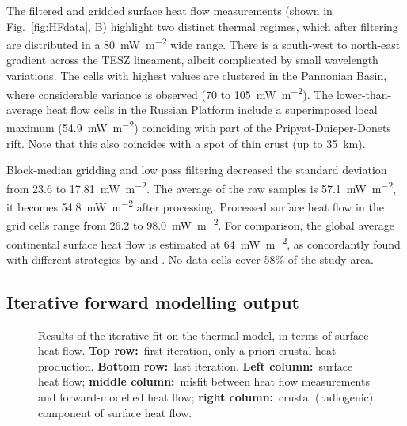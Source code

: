The filtered and gridded surface heat flow measurements (shown in Fig.~\ref{fig:HFdata}, B) highlight two distinct thermal regimes, which after filtering are distributed in a 80~\si{\milli \watt \per \square \metre} wide range.
There is a south-west to north-east gradient across the TESZ lineament, albeit complicated by small wavelength variations.
The cells with highest values are clustered in the Pannonian Basin, where considerable variance is observed (70 to 105~\si{\milli \watt \per \square \metre}).
The lower-than-average heat flow cells in the Russian Platform include a superimposed local maximum (54.9~\si{\milli \watt \per \square \metre}) coinciding with part of the Pripyat-Dnieper-Donets rift.
Note that this also coincides with a spot of thin crust (up to 35~\si{\kilo \metre}).

Block-median gridding and low pass filtering decreased the standard deviation from 23.6 to 17.81~\si{\milli \watt \per \square \metre}.
The average of the raw samples is 57.1~\si{\milli \watt \per \square \metre}, it becomes 54.8~\si{\milli \watt \per \square \metre} after processing.
Processed surface heat flow in the grid cells range from 26.2 to 98.0~\si{\milli \watt \per \square \metre}.
For comparison, the global average continental surface heat flow is estimated at 64~\si{\milli \watt \per \square \metre}, as concordantly found with different strategies by \textcite{Davies2010} and \textcite{Pollack1993}.
No-data cells cover 58\% of the study area.

\subsection{Iterative forward modelling output}
\label{ss:Appl:DiscTherm:FWD}

\begin{figure}
	\begin{adjustbox}{center}
	\end{adjustbox}
	\caption[Results of the iterative fit on the thermal model, in terms of surface heat flow.]{Results of the iterative fit on the thermal model, in terms of surface heat flow. \textbf{Top row:}~first iteration, only a-priori crustal heat production. \textbf{Bottom row:}~last iteration. \textbf{Left column:}~surface heat flow; \textbf{middle column:}~misfit between heat flow measurements and forward-modelled heat flow; \textbf{right column:}~crustal (radiogenic) component of surface heat flow.}
	\label{fig:Qresults}
\end{figure}

